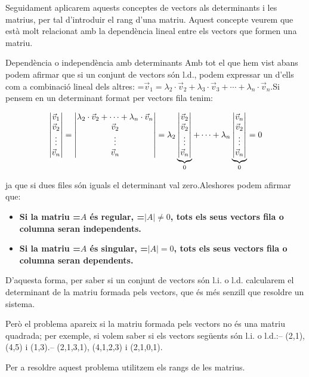 \documentclass[11pt,a4paper]{article}
\newcommand{\fmm}[1]{\setbox0=\hbox{$#1$}\ifdim\wd0>\linewidth\fmdisp{#1}\else\mbox{\box0}\fi}
\newcommand{\fmdisp}[1]{\[\setbox2=\hbox{$\displaystyle #1$}\ifdim\wd2>\linewidth\resizebox{\linewidth}{!}{\box2}\else\box2\fi\]}
\begin{document}
Seguidament aplicarem aquests conceptes de vectors als determinants i les matrius, per tal d'introduir el rang d'una matriu. Aquest concepte veurem que està molt relacionat amb la dependència lineal entre els vectors que formen una matriu.

\begin{fmprop}{Dependència o independència amb determinants}
Amb tot el que hem vist abans podem afirmar que si un conjunt de vectors són l.d., podem expressar un d'ells com a combinació lineal dels altres: \fmm{\vec v_1=\lambda_2\cdot\vec v_2+\lambda_3\cdot\vec v_3+\cdots+\lambda_n\cdot\vec v_n}.\newline Si pensem en un determinant format per vectors fila tenim:

\fmdisp{\begin{vmatrix}\vec v_1\\ \vec v_2\\ \vdots\\ \vec v_n\end{vmatrix}=\begin{vmatrix}\lambda_2\cdot\vec v_2+\cdots+\lambda_n\cdot\vec v_n\\ \vec v_2\\ \vdots\\ \vec v_n\end{vmatrix}=\lambda_2\underbrace{\begin{vmatrix}\vec v_2\\ \vec v_2\\ \vdots\\ \vec v_n\end{vmatrix}}_{0}+\cdots+\lambda_n\underbrace{\begin{vmatrix}\vec v_n\\ \vec v_2\\ \vdots\\ \vec v_n\end{vmatrix}}_{0}=0}

ja que si dues files són iguals el determinant val zero.\newline Aleshores podem afirmar que:

\begin{itemize}
\item \textbf{Si la matriu \fmm{A} és regular, \fmm{|A|\neq0}, tots els seus vectors fila o columna seran independents.}
\item \textbf{Si la matriu \fmm{A} és singular, \fmm{|A|=0}, tots els seus vectors fila o columna seran dependents.}
\end{itemize}

D'aquesta forma, per saber si un conjunt de vectors són l.i. o l.d. calcularem el determinant de la matriu formada pels vectors, que és més senzill que resoldre un sistema.

Però el problema apareix si la matriu formada pels vectors no és una matriu quadrada; per exemple, si volem saber si els vectors següents són l.i. o l.d.:\newline -- (2,1), (4,5) i (1,3).\newline -- (2,1,3,1), (4,1,2,3) i (2,1,0,1).

Per a resoldre aquest problema utilitzem els rangs de les matrius.
\end{fmprop}
\end{document}
